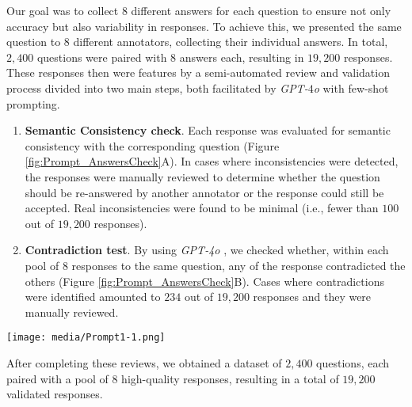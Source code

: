 Our goal was to collect 8 different answers for each question to ensure not only accuracy but also variability in responses. To achieve this, we presented the same question to $8$ different annotators, collecting their individual answers. In total, $2,400$ questions were paired with 8 answers each, resulting in $19,200$ responses.\\
These responses then were features by a semi-automated review and validation process divided into two main steps, both facilitated by \textit{GPT-$4$o} with few-shot prompting. 
\begin{enumerate}
    \item \textbf{Semantic Consistency check}. Each response was evaluated for semantic consistency with the corresponding question (Figure \ref{fig:Prompt_AnswersCheck}A). In cases where inconsistencies were detected, the responses were manually reviewed to determine whether the question should be re-answered by another annotator or the response could still be accepted. Real inconsistencies were found to be minimal (i.e., fewer than $100$ out of $19,200$ responses).
    \item \textbf{Contradiction test}. By using \textit{GPT-4o} \cite{openai2024gpt4ocard}, we checked whether, within each pool of $8$ responses to the same question, any of the response contradicted the others (Figure \ref{fig:Prompt_AnswersCheck}B). Cases where contradictions were identified amounted to $234$ out of $19,200$ responses and they were manually reviewed.
\end{enumerate}

\begin{figure*}[t]
    \small
  \texttt{[image: media/Prompt1-1.png]}
  \caption{Prompts used for Answers' semi-automatic validation. Prompts were provided with some examples (i.e., few-shot prompting) but here in the Figure only the main instructions are presented.}
  \label{fig:Prompt_AnswersCheck}
\end{figure*}


After completing these reviews, we obtained a dataset of $2,400$ questions, each paired with a pool of $8$ high-quality responses, resulting in a total of $19,200$ validated responses. %


